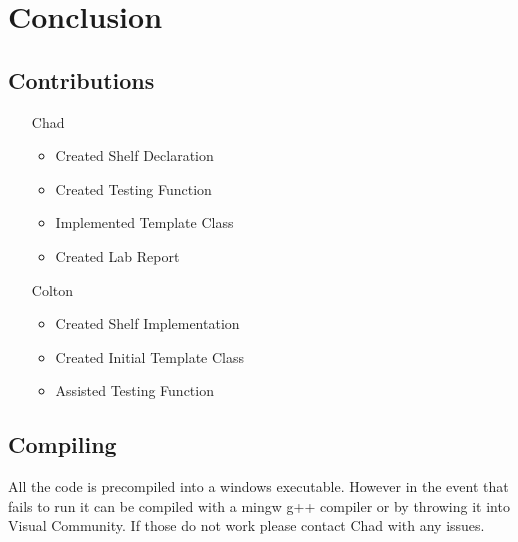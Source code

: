 \documentclass[11pt]{article}
\begin{document}
	\section{Conclusion}
	\subsection{Contributions}
	\begin{itemize}
		\item [Chad]
		\begin{itemize}
			\item Created Shelf Declaration
			\item Created Testing Function
			\item Implemented Template Class
			\item Created Lab Report
		\end{itemize}
		\item [Colton]
		\begin{itemize}
			\item Created Shelf Implementation
			\item Created Initial Template Class
			\item Assisted Testing Function
		\end{itemize}
	\end{itemize}
	\subsection{Compiling}
	All the code is precompiled into a windows executable. However in the event that fails to run it can be compiled with a mingw g++ compiler or by throwing it into Visual Community. If those do not work please contact Chad with any issues.
\end{document}
